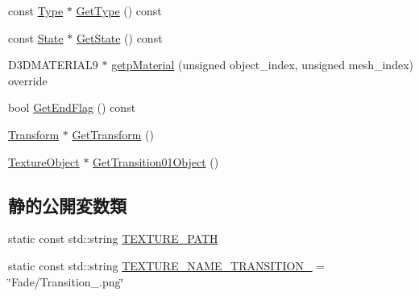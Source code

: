 \begin{DoxyCompactItemize}
\item 
const \mbox{\hyperlink{class_fade_ac06f27215b454aa05b93c236476d6e80}{Type}} $\ast$ \mbox{\hyperlink{class_fade_aed5a29d39a5fd6161a9aed73d5f30870}{Get\+Type}} () const
\item 
const \mbox{\hyperlink{class_fade_ae77826bf3ff2ab95fb7b3b6f95cba80a}{State}} $\ast$ \mbox{\hyperlink{class_fade_aeb41dfcadf75dd4c980da68e243cc310}{Get\+State}} () const
\item 
D3\+D\+M\+A\+T\+E\+R\+I\+A\+L9 $\ast$ \mbox{\hyperlink{class_fade_a69db8b97a493082644fbd82c9ef3d1aa}{getp\+Material}} (unsigned object\+\_\+index, unsigned mesh\+\_\+index) override
\item 
bool \mbox{\hyperlink{class_fade_acc8adf28ce2e4270e5fb3907d83dadd0}{Get\+End\+Flag}} () const
\item 
\mbox{\hyperlink{class_transform}{Transform}} $\ast$ \mbox{\hyperlink{class_fade_a1a177209e72a27858ceb2d339321e9c4}{Get\+Transform}} ()
\item 
\mbox{\hyperlink{class_texture_object}{Texture\+Object}} $\ast$ \mbox{\hyperlink{class_fade_a4e047c532d430095e7d0d70288289a82}{Get\+Transition01\+Object}} ()
\end{DoxyCompactItemize}
\subsection*{静的公開変数類}
\begin{DoxyCompactItemize}
\item 
static const std\+::string \mbox{\hyperlink{class_fade_acd9c0d6231180af183d6301f31fa0053}{T\+E\+X\+T\+U\+R\+E\+\_\+\+P\+A\+TH}}
\item 
static const std\+::string \mbox{\hyperlink{class_fade_ab5d6f86f07e33205224fa486ff22c51d}{T\+E\+X\+T\+U\+R\+E\+\_\+\+N\+A\+M\+E\+\_\+\+T\+R\+A\+N\+S\+I\+T\+I\+O\+N\+\_}} = \char`\"{}Fade/Transition\+\_.\+png\char`\"{}
\end{DoxyCompactItemize}
